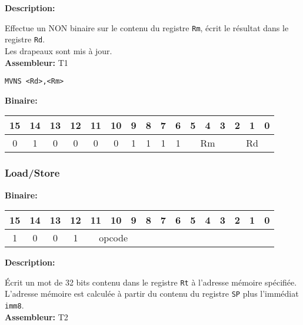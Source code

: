 \documentclass{article}
\newcounter{subsubsubsection}[subsubsection]
\begin{document}

\textbf{Description: }

Effectue un NON binaire sur le contenu du registre \texttt{Rm}, écrit le résultat dans le registre \texttt{Rd}.\\
Les drapeaux sont mis à jour.\\

\textbf{Assembleur:} T1

\begin{lstlisting}
MVNS <Rd>,<Rm>
\end{lstlisting}

\textbf{Binaire:}\\

\begin{tabular}{| c c c c c c c c c c c c c c c c |}
\hline
15 & 14 & 13 & 12 & 11 & 10 & \multicolumn{1}{|c}{9} & 8 & 7 & 6 & \multicolumn{1}{|c}{5} & 4 & 3 & \multicolumn{1}{|c}{2} & 1 & 0 \\
\hline
0 & 1 & 0 & 0 & 0 & 0 & \multicolumn{1}{|c}{1} & 1 & 1 & 1 & \multicolumn{3}{|c}{Rm} & \multicolumn{3}{|c|}{Rd} \\
\hline
\end{tabular}


\subsubsection{Load/Store}

\textbf{Binaire:}\\

\begin{tabular}{| c c c c c c c c c c c c c c c c |}
\hline
15 & 14 & 13 & 12 & \multicolumn{1}{|c}{11} & 10 & 9 & \multicolumn{1}{|c}{8} & 7 & 6 & 5 & 4 & 3 & 2 & 1 & 0 \\
\hline
1 & 0 & 0 & 1 & \multicolumn{3}{|c}{opcode} & \multicolumn{9}{|c|}{} \\
\hline
\end{tabular}


\textbf{Description: }

Écrit un mot de 32 bits contenu dans le registre \texttt{Rt} à l'adresse mémoire spécifiée.\\
L'adresse mémoire est calculée à partir du contenu du registre \texttt{SP} plus l'immédiat \texttt{imm8}.\\

\textbf{Assembleur:} T2
\end{document}
